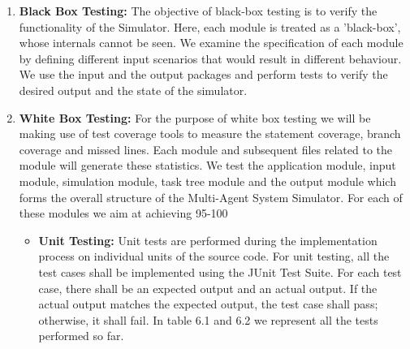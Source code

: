 \begin{enumerate}

\item \textbf{Black Box Testing:} The objective of black-box testing is to verify the functionality of the Simulator. Here, each module is treated as a 'black-box', whose internals cannot be seen. We examine the specification of each module by defining different
input scenarios that would result in different behaviour. We use the input and the output packages and perform tests to verify the desired output and the state of the simulator.

\item \textbf{White Box Testing:} For the purpose of white box testing we will be making use of test coverage tools to measure the statement coverage, branch coverage and missed lines. Each module and subsequent files related to the module will generate these statistics. We test the application module, input module, simulation module, task tree module and the output module which forms the overall structure of the Multi-Agent System Simulator. For each of these modules we aim at achieving 95-100%

\begin{itemize}
\item \textbf{Unit Testing:} Unit tests are performed during the implementation process on individual units of the source code. For unit testing, all the test cases shall be implemented using the JUnit Test Suite. For each test case, there shall be an expected output and an actual output. If the actual output matches the expected output, the test case shall pass; otherwise, it shall fail. In table 6.1 and 6.2 we represent all the tests performed so far.

\begin{table}[H]


\end{table}
\end{itemize}
\end{enumerate}
